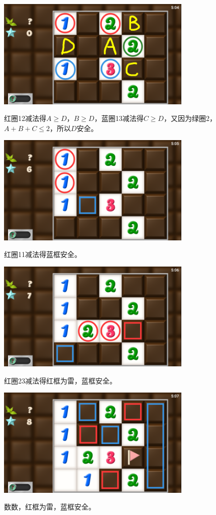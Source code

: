 \subsection{} %
\begin{center}
    \includegraphics[width=0.7\textwidth]{puzzle/77-1.png}
\end{center}
红圈12减法得$A\ge D$，$B\ge D$，蓝圈13减法得$C\ge D$，又因为绿圈2，$A+B+C\le 2$，所以$D$安全。
\begin{center}
    \includegraphics[width=0.7\textwidth]{puzzle/77-2.png}
\end{center}
红圈11减法得蓝框安全。
\begin{center}
    \includegraphics[width=0.7\textwidth]{puzzle/77-3.png}
\end{center}
红圈23减法得红框为雷，蓝框安全。
\begin{center}
    \includegraphics[width=0.7\textwidth]{puzzle/77-4.png}
\end{center}
数数，红框为雷，蓝框安全。

